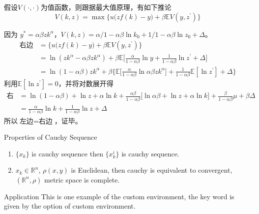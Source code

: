 \documentclass[color=green,mathpazo,titlestyle=hang,11pt]{elegantbook}
\begin{document}
\lipsum[5-6]
\begin{newcorol}
假设$V(\cdot,\cdot)$为值函数，则跟据最大值原理，有如下推论
\[
V(k,z)=\max\Big\{u\big(zf(k)-y\big)+\beta \mathbb{E}V(y,z^\prime)\Big\}
\]
\end{newcorol}

\begin{newproof}
因为 $y^*=\alpha\beta z k^\alpha$，$V(k,z)=\alpha/1-\alpha\beta\ln k_0+1/1-\alpha\beta \ln z_0+\Delta$。
\begin{align*}
\text{右边}&=\Big\{u\big(zf(k)-y\big)+\beta \mathbb{E}V(y,z^\prime)\Big\}\\
&=\ln(zk^\alpha-\alpha\beta zk^\alpha)+\beta\mathbb{E}\Big[\frac{\alpha}{1-\alpha\beta}\ln y+\frac{1}{1-\alpha\beta}\ln z^\prime+\Delta\Big]\\
&=\ln(1-\alpha\beta)zk^\alpha+\beta\Big\{\mathbb{E}\big[\frac{\alpha}{1-\alpha\beta}\ln \alpha\beta z k^\alpha\big]+\frac{1}{1-\alpha\beta}\mathbb{E}[\ln z^\prime]+\Delta\Big\}
\end{align*}
利用$\mathbb{E}[\ln z^\prime]=0$，并将对数展开得
\begin{align*}
\text{右边}&=\ln (1-\alpha\beta)+\ln z+\alpha\ln k+\frac{\alpha\beta}{1-\alpha\beta}\big[\ln \alpha\beta+\ln z+\alpha\ln k\big]+\frac{\beta}{1-\alpha\beta}\mu+\beta \Delta\\
&=\frac{\alpha}{1-\alpha\beta}\ln k+\frac{1}{1-\alpha\beta}\ln z+\Delta
\end{align*}
所以$\text{左边}=\text{右边}$，证毕。
\end{newproof}



\begin{property}
Properties of Cauchy Sequence
\begin{enumerate}\parskip=0pt \itemsep=0pt
\item $\{x_k\}$ is cauchy sequence then $\{x_k^i\}$ is cauchy sequence.
\item $x_k\in \mathbb{R}^n$, $\rho(x,y)$ is Euclidean, then cauchy is equivalent to convergent, $(\mathbb{R}^n,\rho)$ metric space is complete.
\end{enumerate}
\end{property}


\lipsum[7]

\begin{custom}{Application}
This is one example of the custom environment, the key word is given by the option of custom environment.
\end{custom}
\end{document}
